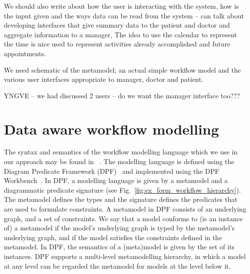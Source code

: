 \documentclass[a4paper]{llncs}
\begin{document}
We should also write about how the user is interacting with the system, how is the input given and  the ways data can be read from the system – can talk about developing interfaces that give 
summary data to the patient and doctor and aggregate information to a manager, The idea to use the calendar to represent the time is nice used to represent  activities already accomplished and 
future appointments.

We need schematic of the metamodel; an actual simple workflow model and the various user interfaces appropriate to manager, doctor and patient.  

YNGVE – we had discussed 2 users – do we want the manager interface too???


\section{Data aware workflow modelling}\label{label:data_aware_derf}
The syntax and semantics of the workflow modelling language which we use in our approach may be found in ~\cite{RutleMacCaullEtAl2012ECMFA,RutleWangEtAl2012FHIES}. %
The modelling language is defined using the Diagram Predicate Framework (DPF)~\cite{Rutle10} and implemented using the DPF Workbench~\cite{LamoWangMMR12SCI}. 
In DPF, a modelling language is given by a metamodel and a diagrammatic predicate signature (see Fig.~\ref{fig:ex_form_workflow_hierarchy}). 
The metamodel defines the types and the signature defines the predicates that are used to formulate constraints. 
A metamodel in DPF consists of an underlying graph, and a set of constraints.
We say that a model conforms to (is an instance of) a metamodel if the model's underlying graph is typed by the metamodel's underlying graph, and if the model satisfies the constraints defined in the metamodel. 
In DPF, the semantics of a (meta)model is given by the set of its instances. 
DPF supports a multi-level metamodelling hierarchy, in which a model at any level can be regarded the metamodel for models at the level below it.
\end{document}
